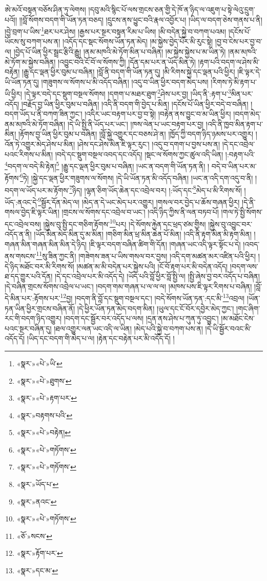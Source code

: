 ཨེ་མའོ་བསྟན་བཅོས་ཤིན་ཏུ་ལེགས། །དབུ་མའི་སྙིང་པོ་ལས་གྲངས་ཅན་གྱི་དེ་ཁོ་ན་ཉིད་ལ་འཇུག་པ་སྟེ་ལེའུ་དྲུག་པའོ།། །།བློ་སོགས་བདག་གི་ཡོན་ཏན་བཅད། །དྲུངས་ནས་ཕྱུང་བའི་རྣལ་འབྱོར་པ། །ཡིད་ལ་བདག་ཅེས་གནས་པ་ནི། །བྱེ་བྲག་པ་ཡིས་\footnote{«སྣར་»«པེ་»ཡི་}ཐར་པར་ཤེས། །རྒྱས་པར་སྔར་བསྟན་རིམ་པ་ཡིས། །མི་བདེན་སྐྱེ་བ་བཀག་པའམ། །དངོས་པོ་ཡོངས་སུ་བཀག་པས་ན། །འདོད་དང་སྡང་སོགས་ཡོན་ཏན་མེད། །མ་སྐྱེས་བྱེད་པོར་མི་རུང་སྟེ། །བྱ་བ་ངེས་པར་བྱ་བ་ལ། །བྱེད་པོ་ཡིན་ཕྱིར་སྦྲང་རྩིའི་རྒྱུ། །ནམ་མཁའི་མེ་ཏོག་མིན་པ་བཞིན། །མ་སྐྱེས་སྐྱེས་པ་མ་ཡིན་ཏེ། །ནམ་མཁའི་མེ་ཏོག་མ་སྐྱེས་བཞིན། །འབྱུང་བའི་ངོ་བོ་ལ་སོགས་ཀྱི། །དོན་དམ་པར་ན་ཡོད་མིན་ཏེ། །རྟག་པའི་བདག་ལ་ཤེས་མི་བརྟེན། །རྒྱུ་དང་ལྡན་ཕྱིར་བུམ་པ་བཞིན། །བློ་ནི་བདག་གི་ཡོན་ཏན་དུ། །མི་རིགས་སྐྱེ་དང་ལྡན་པའི་ཕྱིར། །ཇི་ལྟར་དེ་ཡི་ཡོན་ཏན་དུ། །གཟུགས་ལ་སོགས་པ་མི་འདོད་བཞིན། །འདུ་བ་ཡིན་ཕྱིར་བདག་མེད་པས། །རིགས་ཏེ་མི་རྟག་པ་ཡི་ཕྱིར། །དེ་ལྟར་བདེ་དང་སྡུག་བསྔལ་སོགས། །དགག་པ་མཐར་ཐུག་\footnote{«སྣར་»«པེ་»ཐུགས་}ཤེས་པར་བྱ། །ཡིད་ནི་:རྟག་པ་\footnote{«སྣར་»«པེ་»རྟག་པར་}མིན་པར་འདོད། །བརྗོད་བྱ་ཡིན་ཕྱིར་བུམ་པ་བཞིན། །འདི་ནི་བདག་གི་བྱེད་པ་མིན། །དངོས་པོ་ཡིན་ཕྱིར་བདེ་བ་བཞིན། །བདག་ཡོད་པ་ནི་བཀག་ཟིན་ཀྱང་། །འདིར་ཡང་བརྟག་པར་བྱ་བ་སྟེ། །བརྟེན་ནས་བྱུང་བ་མ་ཡིན་ཕྱིར། །བདག་མེད་ནམ་མཁའི་མེ་ཏོག་བཞིན། །དེ་ཡི་སྤྱི་ནི་ཡོད་པར་ཡང་། །ཁས་ལེན་པ་ཡང་བརྟག་པར་བྱ། །འདི་ནི་ཁྱབ་མིན་རྟག་པ་མིན། །རྟོགས་བྱ་ཡིན་ཕྱིར་བུམ་པ་བཞིན། །བློ་སྐྱེ་འགྱུར་དང་བཅས་ཤེ་ན། །ཁྱོད་ཀྱི་བདག་ཉིད་ཉམས་པར་འགྱུར། །འོན་ཏེ་འགྱུར་མེད་ཤེས་པ་མིན། །ཤེས་དང་ཤེས་མིན་ཇི་ལྟར་རུང་། །འདུ་བ་དགག་པ་བྱས་པས་ན། །དེ་དང་འབྲེལ་པའང་རིགས་པ་མིན། །བདེ་དང་སྡུག་བསྔལ་འབད་དང་འདོད། །སྡང་ལ་སོགས་ཀྱང་ཚུལ་འདི་ཡིན། །:བརྟག་པའི་\footnote{«སྣར་»བརྟགས་པའི་}བདག་ལ་བདེ་མི་རྟེན།\footnote{«སྣར་»«པེ་»བརྟེན།} །རྒྱུ་དང་ལྡན་ཕྱིར་བུམ་པ་བཞིན། །ཡང་ན་བདག་གི་ཡོན་ཏན་ནི། །
བདེ་བ་ཡིན་པར་མ་རྟོགས་\footnote{«སྣར་»«པེ་»གཏོགས་}ཏེ། །སྐྱེ་དང་ལྡན་ཕྱིར་གཟུགས་ལ་སོགས། །དེ་ཡི་ཡོན་ཏན་མི་འདོད་བཞིན། །ཡང་ན་འདི་དག་འདུ་བ་ནི། །བདག་ལ་ཡོད་པར་མ་རྟོགས་\footnote{«སྣར་»«པེ་»གཏོགས་}ཉིད། །ལྷན་ཅིག་ཡོད་ཆེན་དང་འབྲེལ་བར། །:ཡོད་དང་\footnote{«སྣར་»ཡོད་པ་}མེད་པ་མི་རིགས་སོ། །ཡོད་:ནའང་དེ་\footnote{«སྣར་»ནའང་}སྦྱོར་དོན་མེད་ལ། །མེད་ན་དེ་ཡང་མེད་པར་འགྱུར། །གསལ་བར་བྱེད་པ་ཆོས་གཞན་ཕྱིར། །དེ་ནི་གསལ་བྱེད་ཇི་ལྟར་ཡིན། །གྲངས་ལ་སོགས་དང་འབྲེལ་བ་ཡང་། །འདི་ཉིད་ཀྱིས་ནི་ལན་བཏབ་པོ། །གལ་ཏེ་སྤྱི་སོགས་དང་འབྲེལ་བས། །སྐྱེས་བུ་སྤྱི་དང་གཅིག་རྟོགས་\footnote{«སྣར་»«པེ་»གཏོགས་}པར། །དེ་སོགས་རྐྱེན་དང་ཕྲད་ཙམ་གྱིས། །སྐྱེས་བུ་འབྱུང་བར་འདོད་ན་ནི། །ཡོད་མིན་མེད་མིན་དུ་མ་མིན། །གཅིག་མིན་ཕྲ་མིན་ཆེན་པོ་མིན། །འདི་ནི་རྟག་མིན་མི་རྟག་མིན། །གཞན་མིན་གཞན་མིན་མིན་དེ་ཉིད། །ཇི་ལྟར་བདག་བཞིན་ཚིག་གི་དོན། །གཞན་ཡང་འདི་ལྟར་སྟོང་པ་དེ། །འབད་ནས་གསངས་\footnote{«ཅོ་»སངས་}སུ་ཟིན་ཀྱང་ནི། །གཟེགས་ཟན་པ་ཡིས་གསལ་བར་བྱས། །འདི་དག་མཚན་མར་འཛིན་པའི་ཕྱིར། །དེ་ཉིད་མཐོང་བར་མི་རིགས་སོ། །མཚན་མ་མི་བདེན་པར་སྐྱེས་པའི། །ངོ་བོ་རྟག་པར་མི་བདེན་འདོད། །བདག་ལས་ཐ་དད་གྱུར་པའི་དོན། །དེ་དང་འབྲེལ་པར་མི་འདོད་དེ། །ཡོད་པའི་བློ་ཕྱིར་བློ་སྤྱི་ལ། །སྤྱི་ཞེས་བྱ་བར་འདོད་པ་བཞིན། །དེ་བཞིན་གྲངས་སོགས་འབྲེལ་པ་ཡང་། །བདག་གམ་གཞན་པ་ལ་ལ་ལ། །མཁས་པས་ཇི་ལྟར་རིགས་པ་བཞིན། །བློ་དེ་མིན་པར་:རྟོགས་པར་\footnote{«སྣར་»རྟོག་པར་}བྱ། །བདག་ནི་བློ་དང་སྡུག་བསྔལ་དང་། །བདེ་སོགས་ཡོན་ཏན་:དང་མི་\footnote{«སྣར་»དང་མ་}འབྲལ། །ཡོན་ཏན་ཡིན་ཕྱིར་གྲངས་བཞིན་ནོ། །དེ་ཕྱིར་ཡོན་ཏན་མེད་བདག་མིན། །ཡུལ་དང་ངོ་བོར་དབྱེར་མེད་ཀྱང་། །གང་ཞིག་རང་གི་བདག་ཉིད་འགྱུར། །བདག་དང་སྦྱོར་བར་འདོད་པ་ལས། །དྲན་ནས་ཤེས་པ་ཀུན་ཏུ་འབྱུང་། །མ་མཐོང་ངེས་པའང་སྔར་བཞིན་དུ། །ཐལ་འགྱུར་ལན་ཡང་འདི་ལ་ཡིན། །མེད་པའི་སྐྱེ་བ་བཀག་པས་ན། །དེ་ཡི་སྦྱོར་བའང་མི་འདོད་དོ། །ཡིད་དང་བདག་གི་མེད་པ་ལ། །རྟེན་དང་བརྟེན་པར་མི་འདོད་དོ། །
